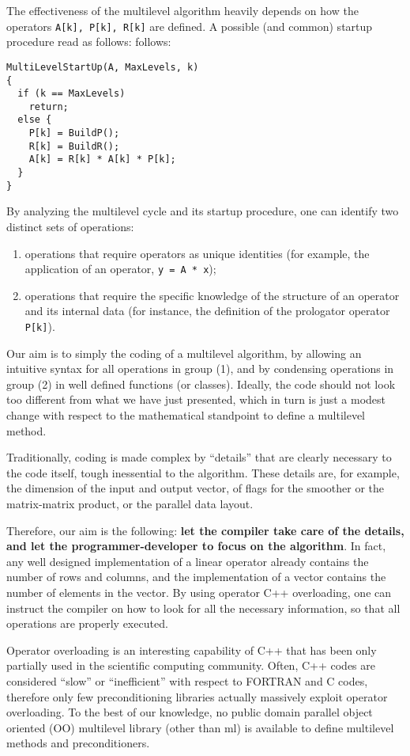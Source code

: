 \documentclass{article}[11pt]
\newcommand{\ML}     {{\sc ml}}
\begin{document}
The effectiveness of the multilevel algorithm heavily depends on 
how the operators \verb!A[k], P[k], R[k]! are defined. A possible 
(and common) startup procedure read as follows:
follows:
\begin{verbatim}
MultiLevelStartUp(A, MaxLevels, k)
{
  if (k == MaxLevels)
    return;
  else {
    P[k] = BuildP(); 
    R[k] = BuildR();
    A[k] = R[k] * A[k] * P[k];
  }
}
\end{verbatim}

By analyzing the multilevel cycle and its startup procedure, one can identify
two distinct sets of operations:
\begin{enumerate}
\item operations that require operators as unique identities (for example,
  the application of an operator, \verb!y = A * x!);
\item operations that require the specific knowledge of the structure
  of an operator and its internal data (for instance, the definition of the
  prologator operator \verb!P[k]!).
\end{enumerate}

Our aim is to simply the coding of a multilevel algorithm, by allowing
an intuitive syntax for all operations in group (1), and by condensing
operations in group (2) in well defined functions (or classes). Ideally, the
code should not look too different from what we have just presented, which
in turn is just a modest change with respect to the mathematical standpoint
to define a multilevel method.

Traditionally, coding is made complex by ``details'' that are 
clearly necessary to the code itself, tough inessential to the algorithm. 
These details are, for
example, the dimension of the input and output vector, of flags for the
smoother or the matrix-matrix product, or the parallel data layout.

Therefore, our aim is the following: {\bf let the
compiler take care of the details, and let the programmer-developer to
focus on the algorithm}. In fact, any well designed implementation of a linear
operator already contains the number of rows and columns, and the
implementation of a vector contains the number of elements in the vector.
By using operator C++ overloading, one can instruct the compiler on how to
look for all the necessary information, so that all operations are properly
executed.

\smallskip

Operator overloading is an interesting capability of C++ that has been only
partially used in the scientific computing community. Often, C++ codes are
considered ``slow'' or ``inefficient'' with respect to FORTRAN and C codes,
therefore only few preconditioning libraries actually massively exploit 
operator overloading. To the best of our knowledge, no public domain parallel
object oriented (OO) multilevel library (other than \ML) is available to
define multilevel methods and preconditioners.
\end{document}
